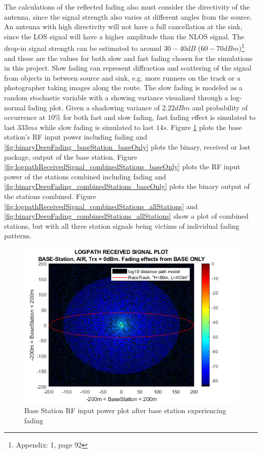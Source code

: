 \noindent The calculations of the reflected fading also must consider the directivity of the antenna, since the signal strength also varies at different angles from the source. An antenna with high directivity will not have a full cancellation at the sink, since the LOS signal will have a higher amplitude than the NLOS signal. The drop-in signal strength can be estimated to around $30-40dB$ ($60-70dBm$)\footnote{Appendix: 1, page 92} and these are the values for both slow and fast fading chosen for the simulations in this project. Slow fading can represent diffraction and scattering of the signal from objects in between source and sink, e.g. more runners on the track or a photographer taking images along the route. The slow fading is modeled as a random stochastic variable with a showing variance visualized through a log-normal fading plot. Given a shadowing variance of $2.22dBm$ and probability of occurrence at $10\%$ for both fast and slow fading, fast fading effect is simulated to last $333 ms$ while slow fading is simulated to last $14s$. Figure \ref{fig:logpathReceivedSignal_baseStation_baseOnly} plots the base station's RF input power including fading and \ref{fig:binaryDeepFading_baseStation_baseOnly} plots the binary, received or lost package, output of the base station. Figure \ref{fig:logpathReceivedSignal_combinedStations_baseOnly} plots the RF input power of the stations combined including fading and \ref{fig:binaryDeepFading_combinedStations_baseOnly} plots the binary output of the stations combined. Figure \ref{fig:logpathReceivedSignal_combinedStations_allStations} and \ref{fig:binaryDeepFading_combinedStations_allStations} show a plot of combined stations, but with all three station signals being victims of individual fading patterns. 

\begin{figure}[h]
	\centering
	\includegraphics[width=\linewidth]{theory/fading/fig/logpathReceivedSignal_baseStation_baseOnly.png}
	\caption{Base Station RF input power plot after base station experiencing fading}
	\label{fig:logpathReceivedSignal_baseStation_baseOnly}
\end{figure}

